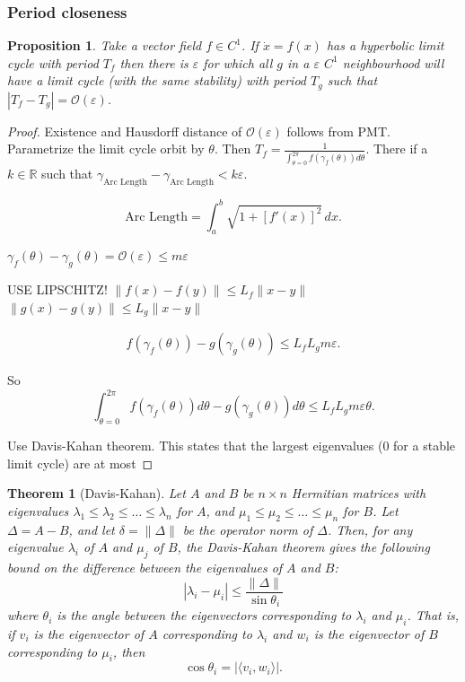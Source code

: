 \documentclass{article}
\newtheorem{theorem}{Theorem}
\newtheorem{proposition}{Proposition}
\theoremstyle{definition} \newtheorem{definition}{Definition}
\theoremstyle{remark} \newtheorem{remark}{Remark}
\newcommand{\reals}{\mathbb{R}}
\newcounter{ct}
\begin{document}
\subsubsection{Period closeness}\label{sec:periodcloseness}
\begin{proposition}\label{prop:periodcloseness}%
Take a vector field $f\in C^1$.
If $\dot x = f(x)$ has a hyperbolic limit cycle with period $T_f$ then there is $\varepsilon$ for which all $g$ in a $\varepsilon$ $C^1$ neighbourhood will have a limit cycle (with the same stability) with period $T_g$ such that  $|T_f-T_g| = \mathcal{O}(\varepsilon)$.
\end{proposition}

\begin{proof}
Existence and Hausdorff distance of $\mathcal{O}(\varepsilon)$ follows from PMT.
Parametrize the limit cycle orbit by $\theta$.
Then $T_f = \frac{1}{\int_{\theta=0}^{2\pi}f(\gamma_f(\theta))d\theta}$.
There if a $k\in\reals$ such that $\gamma_{\text{Arc Length}} - \gamma_{\text{Arc Length}}<k\varepsilon$.

\[\text{Arc Length} = \int_a^b \sqrt{1 + [f'(x)]^2} \, dx.\]

$\gamma_f(\theta)-\gamma_g(\theta) = \mathcal{O}(\varepsilon) \leq m\varepsilon$ %


USE LIPSCHITZ! 
$\|f(x)-f(y)\|\leq L_f\|x-y\|$
$\|g(x)-g(y)\|\leq L_g\|x-y\|$


\begin{align}
f(\gamma_f(\theta)) - g(\gamma_g(\theta)) \leq  L_fL_gm\varepsilon.
\end{align}

So \[\int_{\theta=0}^{2\pi}f(\gamma_f(\theta))d\theta-g(\gamma_g(\theta))d\theta\leq L_fL_gm\varepsilon\theta.\]


Use Davis-Kahan theorem. 
This states that the largest eigenvalues (0 for a stable limit cycle) are at most 
\end{proof}


\begin{theorem}[Davis-Kahan]
Let \( A \) and \( B \) be \( n \times n \) Hermitian matrices with eigenvalues \( \lambda_1 \leq \lambda_2 \leq \dots \leq \lambda_n \) for \( A \), and \( \mu_1 \leq \mu_2 \leq \dots \leq \mu_n \) for \( B \). Let \( \Delta = A - B \), and let \( \delta = \| \Delta \| \) be the operator norm of \( \Delta \). Then, for any eigenvalue \( \lambda_i \) of \( A \) and \( \mu_j \) of \( B \), the Davis-Kahan theorem gives the following bound on the difference between the eigenvalues of \( A \) and \( B \):
\[
|\lambda_i - \mu_i| \leq \frac{\| \Delta \|}{\sin \theta_i}
\]
where \( \theta_i \) is the angle between the eigenvectors corresponding to \( \lambda_i \) and \( \mu_i \). That is, if \( v_i \) is the eigenvector of \( A \) corresponding to \( \lambda_i \) and \( w_i \) is the eigenvector of \( B \) corresponding to \( \mu_i \), then
\[
\cos \theta_i = | \langle v_i, w_i \rangle |.
\]
\end{theorem}
\end{document}
